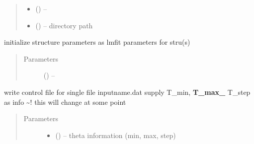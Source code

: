 \documentclass[letterpaper,10pt,english]{sphinxmanual}
\begin{document}
\begin{fulllineitems}
\begin{fulllineitems}
\begin{quote}
\begin{description}
\begin{itemize}
\item {} 
 (\sphinxstyleliteralemphasis{*}) -- 

\item {} 
 (\sphinxstyleliteralemphasis{*}) -- directory path

\end{itemize}

\end{description}\end{quote}

\end{fulllineitems}


\begin{fulllineitems}
\label{\detokenize{rst/structure:mstack.structure.Phase.initialize_structure_params}}
initialize structure parameters as lmfit parameters for stru(s)
\begin{quote}\begin{description}
\item[{Parameters}] \leavevmode
{} (\sphinxstyleliteralemphasis{*}) -- 

\end{description}\end{quote}

\end{fulllineitems}


\begin{fulllineitems}
\label{\detokenize{rst/structure:mstack.structure.Phase.pub_control}}
write control file for single file inputname.dat
supply T\_min, {\color{red}\bfseries{}T\_max\_} T\_step as info \textasciitilde{}! this will change at some point
\begin{quote}\begin{description}
\item[{Parameters}] \leavevmode\begin{itemize}
\item {} 
 (\sphinxstyleliteralemphasis{*}) -- theta information (min, max, step)


\end{itemize}
\end{description}
\end{quote}
\end{fulllineitems}
\end{fulllineitems}
\end{document}
